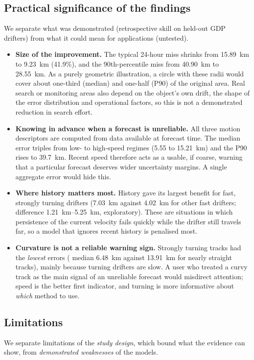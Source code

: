 \subsection{Practical significance of the findings}\label{sec:significance}
We separate what was demonstrated (retrospective skill on held-out GDP drifters) from what it could mean for applications (untested).
\begin{itemize}
  \item \textbf{Size of the improvement.} The typical 24-hour miss shrinks from \SI{15.89}{km} to \SI{9.23}{km} (41.9\%), and the 90th-percentile miss from \SI{40.90}{km} to \SI{28.55}{km}. As a purely geometric illustration, a circle with these radii would cover about one-third (median) and one-half (P90) of the original area. Real search or monitoring areas also depend on the object's own drift, the shape of the error distribution and operational factors, so this is not a demonstrated reduction in search effort.
  \item \textbf{Knowing in advance when a forecast is unreliable.} All three motion descriptors are computed from data available at forecast time. The \GBH{} median error triples from low- to high-speed regimes (\SI{5.55}{} to \SI{15.21}{km}) and the P90 rises to \SI{39.7}{km}. Recent speed therefore acts as a usable, if coarse, warning that a particular forecast deserves wider uncertainty margins. A single aggregate error would hide this.
  \item \textbf{Where history matters most.} History gave its largest benefit for fast, strongly turning drifters (\SI{7.03}{km} against \SI{4.02}{km} for other fast drifters; difference \SIrange{1.21}{5.25}{km}, exploratory). These are situations in which persistence of the current velocity fails quickly while the drifter still travels far, so a model that ignores recent history is penalised most.
  \item \textbf{Curvature is not a reliable warning sign.} Strongly turning tracks had the \emph{lowest} errors (\GBH{} median \SI{6.48}{km} against \SI{13.91}{km} for nearly straight tracks), mainly because turning drifters are slow. A user who treated a curvy track as the main signal of an unreliable forecast would misdirect attention; speed is the better first indicator, and turning is more informative about \emph{which} method to use.
\end{itemize}

\subsection{Limitations}\label{sec:limitations}
We separate limitations of the \emph{study design}, which bound what the evidence can show, from \emph{demonstrated weaknesses} of the models.

